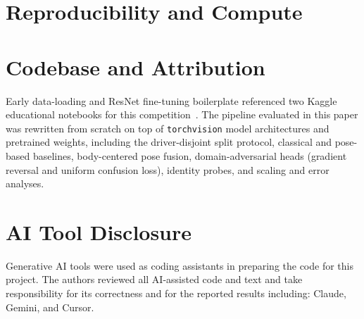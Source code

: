 
\section*{Reproducibility and Compute}

\section*{Codebase and Attribution}

Early data-loading and ResNet fine-tuning boilerplate referenced two Kaggle
educational notebooks for this competition~\cite{pintelasLab6,pintelasLab7}.
The pipeline evaluated in this paper was rewritten from scratch on top of
\texttt{torchvision} model architectures and pretrained weights, including the
driver-disjoint split protocol, classical and pose-based baselines,
body-centered pose fusion, domain-adversarial heads (gradient reversal and
uniform confusion loss), identity probes, and scaling and error analyses.

\section*{AI Tool Disclosure}
Generative AI tools were used as coding assistants in preparing the code for this project.
The authors reviewed all AI-assisted code and text and take responsibility for its correctness and for the reported results including: Claude, Gemini, and Cursor.
